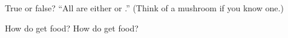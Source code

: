\begin{exercise}[$\star$]\label{exo:g1:plants-animals:4}
True or false? ``All  are either  or .''
(Think of a mushroom if you know one.)
\end{exercise}

\begin{exercise}[$\star\star$]\label{exo:g1:plants-animals:5}
How do  get food? How do  get food?
\end{exercise}

